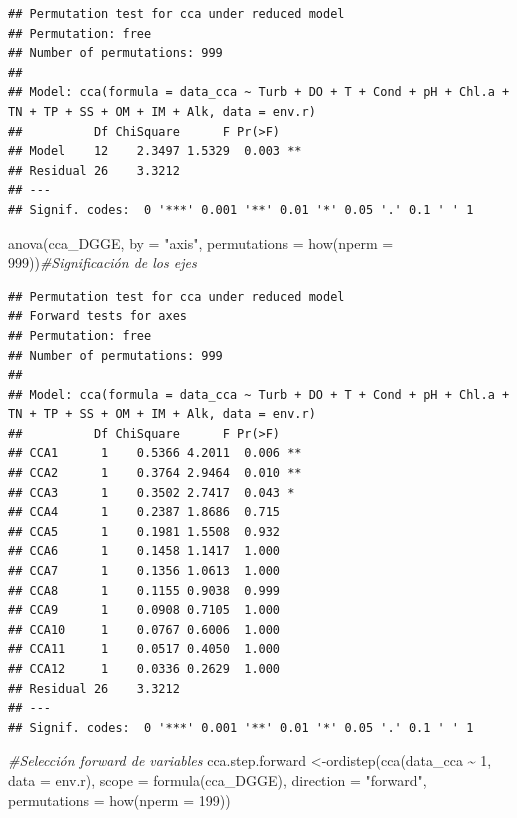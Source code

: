\documentclass[
]{book}
\newenvironment{Shaded}{\begin{snugshade}}{\end{snugshade}}
\newcommand{\AttributeTok}[1]{\textcolor[rgb]{0.77,0.63,0.00}{#1}}
\newcommand{\CommentTok}[1]{\textcolor[rgb]{0.56,0.35,0.01}{\textit{#1}}}
\newcommand{\DecValTok}[1]{\textcolor[rgb]{0.00,0.00,0.81}{#1}}
\newcommand{\FunctionTok}[1]{\textcolor[rgb]{0.00,0.00,0.00}{#1}}
\newcommand{\NormalTok}[1]{#1}
\newcommand{\OtherTok}[1]{\textcolor[rgb]{0.56,0.35,0.01}{#1}}
\newcommand{\SpecialCharTok}[1]{\textcolor[rgb]{0.00,0.00,0.00}{#1}}
\newcommand{\StringTok}[1]{\textcolor[rgb]{0.31,0.60,0.02}{#1}}
\begin{document}
\begin{verbatim}
## Permutation test for cca under reduced model
## Permutation: free
## Number of permutations: 999
## 
## Model: cca(formula = data_cca ~ Turb + DO + T + Cond + pH + Chl.a + TN + TP + SS + OM + IM + Alk, data = env.r)
##          Df ChiSquare      F Pr(>F)   
## Model    12    2.3497 1.5329  0.003 **
## Residual 26    3.3212                 
## ---
## Signif. codes:  0 '***' 0.001 '**' 0.01 '*' 0.05 '.' 0.1 ' ' 1
\end{verbatim}

\begin{Shaded}
\begin{Highlighting}[]
\FunctionTok{anova}\NormalTok{(cca\_DGGE, }\AttributeTok{by =} \StringTok{"axis"}\NormalTok{, }\AttributeTok{permutations =} \FunctionTok{how}\NormalTok{(}\AttributeTok{nperm =} \DecValTok{999}\NormalTok{))}\CommentTok{\#Significación de los ejes}
\end{Highlighting}
\end{Shaded}

\begin{verbatim}
## Permutation test for cca under reduced model
## Forward tests for axes
## Permutation: free
## Number of permutations: 999
## 
## Model: cca(formula = data_cca ~ Turb + DO + T + Cond + pH + Chl.a + TN + TP + SS + OM + IM + Alk, data = env.r)
##          Df ChiSquare      F Pr(>F)   
## CCA1      1    0.5366 4.2011  0.006 **
## CCA2      1    0.3764 2.9464  0.010 **
## CCA3      1    0.3502 2.7417  0.043 * 
## CCA4      1    0.2387 1.8686  0.715   
## CCA5      1    0.1981 1.5508  0.932   
## CCA6      1    0.1458 1.1417  1.000   
## CCA7      1    0.1356 1.0613  1.000   
## CCA8      1    0.1155 0.9038  0.999   
## CCA9      1    0.0908 0.7105  1.000   
## CCA10     1    0.0767 0.6006  1.000   
## CCA11     1    0.0517 0.4050  1.000   
## CCA12     1    0.0336 0.2629  1.000   
## Residual 26    3.3212                 
## ---
## Signif. codes:  0 '***' 0.001 '**' 0.01 '*' 0.05 '.' 0.1 ' ' 1
\end{verbatim}

\begin{Shaded}
\begin{Highlighting}[]
\CommentTok{\#Selección forward de variables}
\NormalTok{cca.step.forward }\OtherTok{\textless{}{-}}\FunctionTok{ordistep}\NormalTok{(}\FunctionTok{cca}\NormalTok{(data\_cca }\SpecialCharTok{\textasciitilde{}} \DecValTok{1}\NormalTok{, }\AttributeTok{data =}\NormalTok{ env.r), }\AttributeTok{scope =} \FunctionTok{formula}\NormalTok{(cca\_DGGE),}
\AttributeTok{direction =} \StringTok{"forward"}\NormalTok{, }\AttributeTok{permutations =} \FunctionTok{how}\NormalTok{(}\AttributeTok{nperm =} \DecValTok{199}\NormalTok{))}
\end{Highlighting}
\end{Shaded}
\end{document}
